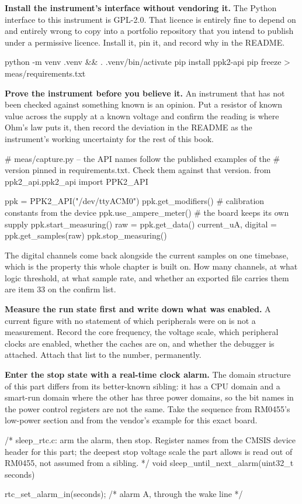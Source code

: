 \begin{steps}
\item \textbf{Install the instrument's interface without vendoring it.} The
Python interface to this instrument is GPL-2.0. That licence is entirely fine
to depend on and entirely wrong to copy into a portfolio repository that you
intend to publish under a permissive licence. Install it, pin it, and record
why in the README.
\begin{shellcode}
python -m venv .venv && . .venv/bin/activate
pip install ppk2-api
pip freeze > meas/requirements.txt
\end{shellcode}

\item \textbf{Prove the instrument before you believe it.} An instrument that
has not been checked against something known is an opinion. Put a resistor of
known value across the supply at a known voltage and confirm the reading is
where Ohm's law puts it, then record the deviation in the README as the
instrument's working uncertainty for the rest of this book.
\begin{pycode}
# meas/capture.py -- the API names follow the published examples of the
# version pinned in requirements.txt. Check them against that version.
from ppk2_api.ppk2_api import PPK2_API

ppk = PPK2_API("/dev/ttyACM0")
ppk.get_modifiers()                 # calibration constants from the device
ppk.use_ampere_meter()              # the board keeps its own supply
ppk.start_measuring()
raw = ppk.get_data()
current_uA, digital = ppk.get_samples(raw)
ppk.stop_measuring()
\end{pycode}
The digital channels come back alongside the current samples on one timebase,
which is the property this whole chapter is built on. How many channels, at what
logic threshold, at what sample rate, and whether an exported file carries them
are item 33 on the confirm list.

\item \textbf{Measure the run state first and write down what was enabled.} A
current figure with no statement of which peripherals were on is not a
measurement. Record the core frequency, the voltage scale, which peripheral
clocks are enabled, whether the caches are on, and whether the debugger is
attached. Attach that list to the number, permanently.

\item \textbf{Enter the stop state with a real-time clock alarm.} The domain
structure of this part differs from its better-known sibling: it has a CPU
domain and a smart-run domain where the other has three power domains, so the
bit names in the power control registers are not the same. Take the sequence
from RM0455's low-power section and from the vendor's example for this exact
board.
\begin{ccode}
/* sleep_rtc.c: arm the alarm, then stop. Register names from the CMSIS
   device header for this part; the deepest stop voltage scale the part
   allows is read out of RM0455, not assumed from a sibling. */
void sleep_until_next_alarm(uint32_t seconds)
{
    rtc_set_alarm_in(seconds);              /* alarm A, through the wake line */

}
\end{ccode}
\end{steps}
